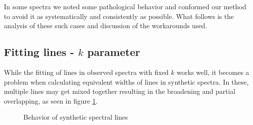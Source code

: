 \documentclass{aa}
\begin{document}
In some spectra we noted some pathological behavior and conformed our method
to avoid it as systematically and consistently as possible. What follows is the
analysis of these such cases and discussion of the workarounds used.

\subsection{Fitting lines - $k$ parameter}
\label{sec:k}

While the fitting of lines in observed spectra with fixed $k$ works well, it
becomes a problem when calculating equivalent widths of lines in synthetic
spectra. In these, multiple lines may get mixed together resulting in the
broadening and partial overlapping, as seen in figure \ref{fig:bad_synth_lines}.

\begin{figure}[h]
  \caption{Behavior of synthetic spectral lines}
  \label{fig:bad_synth_lines}
\end{figure}
\end{document}
